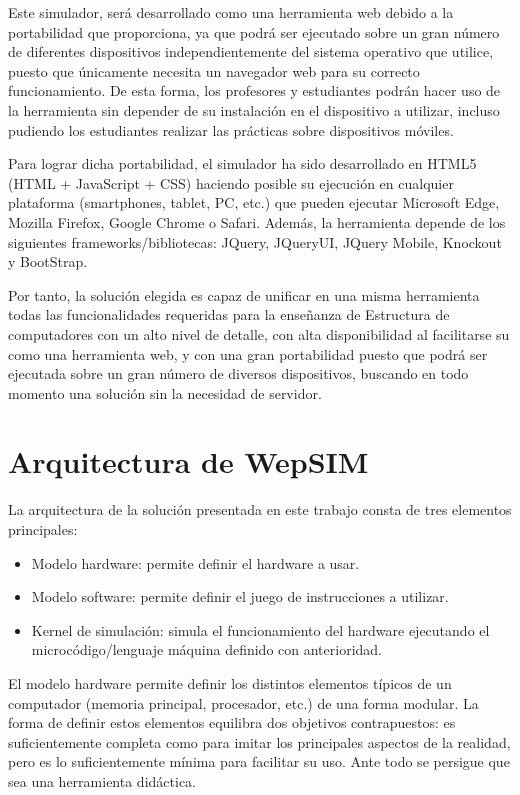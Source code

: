 Este simulador, será desarrollado como una herramienta web debido a la portabilidad que proporciona, ya que podrá ser ejecutado sobre un gran número de diferentes dispositivos independientemente del sistema operativo que utilice, puesto que únicamente necesita un navegador web para su correcto funcionamiento. De esta forma, los profesores y estudiantes podrán hacer uso de la herramienta sin depender de su instalación en el dispositivo a utilizar, incluso pudiendo los estudiantes realizar las prácticas sobre dispositivos móviles.

Para lograr dicha portabilidad, el simulador ha sido desarrollado en HTML5 (HTML + JavaScript + CSS) haciendo posible su ejecución en cualquier plataforma (smartphones, tablet, PC, etc.) que pueden ejecutar Microsoft Edge, Mozilla Firefox, Google Chrome o Safari. Además, la herramienta depende de los siguientes frameworks/bibliotecas: JQuery, JQueryUI, JQuery Mobile, Knockout y BootStrap.

Por tanto, la solución elegida es capaz de unificar en una misma herramienta todas las funcionalidades requeridas para la enseñanza de Estructura de computadores con un alto nivel de detalle, con alta disponibilidad al facilitarse su como una herramienta web, y con una gran portabilidad puesto que podrá ser ejecutada sobre un gran número de diversos dispositivos, buscando en todo momento una solución sin la necesidad de servidor.

\section{Arquitectura de WepSIM}
\label{sec:simulator_architecture}

La arquitectura de la solución presentada en este trabajo consta de tres elementos principales:

\begin{itemize}
\item Modelo hardware: permite definir el hardware a usar.
\item Modelo software: permite definir el juego de instrucciones a utilizar.
\item Kernel de simulación: simula el funcionamiento del hardware ejecutando el microcódigo/lenguaje máquina definido con anterioridad.
\end{itemize}

El modelo hardware permite definir los distintos elementos típicos de un computador (memoria principal, procesador, etc.) de una forma modular. La forma de definir estos elementos equilibra dos objetivos contrapuestos: es suficientemente completa como para imitar los principales aspectos de la realidad, pero es lo suficientemente mínima para facilitar su uso. Ante todo se persigue que sea una herramienta didáctica.

